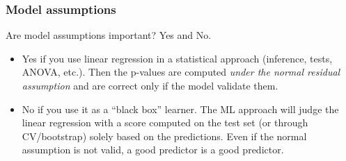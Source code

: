 \begin{frame}
\frametitle{Model assumptions}
Are model assumptions important? Yes and No.
\begin{itemize}
\item Yes if you use linear regression in a statistical approach (inference, tests, ANOVA, etc.). Then the p-values are computed {\it under the normal residual assumption} and are correct only if the model validate them.
\item No if you use it as a ``black box'' learner. The ML approach will judge the linear regression with a score computed on the test set (or through CV/bootstrap) solely based on the predictions. Even if the normal assumption is not valid, a good predictor is a good predictor.
\end{itemize}
\end{frame}
